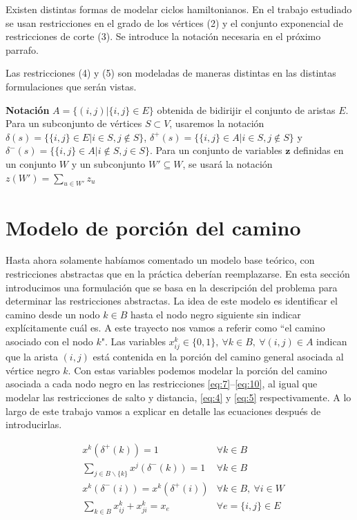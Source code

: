 \documentclass[10pt, a4paper]{article}
\theoremstyle{definition}
\begin{document}
Existen distintas formas de modelar ciclos hamiltonianos. En el trabajo estudiado se usan restricciones en el grado de los vértices (2) y el conjunto exponencial de restricciones de corte (3). Se introduce la notación necesaria en el próximo parrafo.

Las restricciones (4) y (5) son modeladas de maneras distintas en las distintas formulaciones que serán vistas.

\textbf{Notación} $A = \{(i,j) | \{i,j\} \in E\}$ obtenida de bidirijir el conjunto de aristas $E$. 
Para un subconjunto de vértices $S \subset V$, usaremos la notación $\delta(s) = \{\{i,j\} \in E | i \in S, j \notin S\}$,
$\delta^+(s) = \{\{i,j\} \in A | i \in S, j \notin S\}$ y $\delta^-(s) = \{\{i,j\} \in A | i \notin S, j \in S\}$.
Para un conjunto de variables $\textbf{z}$ definidas en un conjunto $W$ y un subconjunto $W' \subseteq W$, se usará la notación $z(W') = \sum_{u \in W'} z_u$

\section{Modelo de porción del camino}

Hasta ahora solamente habíamos comentado un modelo base teórico, con restricciones abstractas que en la práctica deberían reemplazarse. En esta sección introducimos una formulación que se basa en la descripción del problema para determinar las restricciones abstractas. La idea de este modelo es identificar el camino desde un nodo $k \in B$ hasta el nodo negro siguiente sin indicar explícitamente cuál es. A este trayecto nos vamos a referir como “el camino asociado con el nodo $k$". Las variables $x_{i j}^{k} \in\{0,1\},\ \forall k \in B,\ \forall(i, j) \in A$ indican que la arista $(i,j)$ está contenida en la porción del camino general asociada al vértice negro $k$. Con estas variables podemos modelar la porción del camino asociada a cada nodo negro en las restricciones \ref{eq:7}–\ref{eq:10}, al igual que modelar las restricciones de salto y distancia, \ref{eq:4} y \ref{eq:5} respectivamente. A lo largo de este trabajo vamos a explicar en detalle las ecuaciones después de introducirlas.

\begin{align} 
	& x^{k}\left(\delta^{+}(k)\right)=1 & \forall k \in B \label{eq:7} \\
	& \sum_{j \in B \backslash\{k\}} x^{j}\left(\delta^{-}(k)\right)=1 & \forall k \in B \label{eq:8} \\
	& x^{k}\left(\delta^{-}(i)\right)=x^{k}\left(\delta^{+}(i)\right) & \forall k \in B,\ \forall i \in W \label{eq:9} \\
	& \sum_{k \in B} x_{i j}^{k}+x_{j i}^{k}=x_{e} & \forall e=\{i, j\} \in E \label{eq:10}
\end{align}
\end{document}
